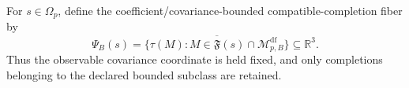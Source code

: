 For \(s\in\Omega_p\), define the coefficient/covariance-bounded compatible-completion fiber by
\[
 \Psi_B(s)
 =\overline{\{\tau(M):M\in\mathfrak F(s)\cap
 \mathcal M_{p,B}^{\mathrm{df}}\}}\subseteq\mathbb R^3.
\]
Thus the observable covariance coordinate is held fixed, and only completions belonging to the declared bounded subclass are retained.